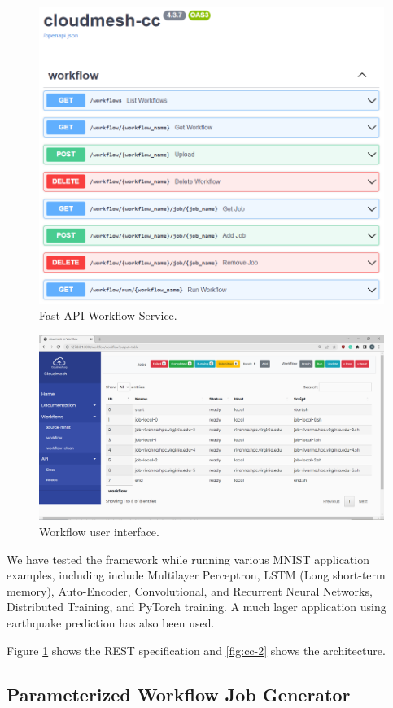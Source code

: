 \documentclass[utf8]{FrontiersinVancouver} %
\begin{document}
\begin{figure}[htb]
\centering\includegraphics[width=0.7\columnwidth]{images/fastapi-service.png}
\caption{Fast API Workflow Service.}
\label{fig:fastapi-cc}
\end{figure}



\begin{figure}[htb]
    \centering
    \includegraphics[width=0.70\columnwidth]{images/cc-1.png}
    \caption{Workflow user interface. }
    \label{fig:cc-3}
\end{figure}


We have tested the framework while running various MNIST application
examples, including include Multilayer Perceptron, LSTM (Long
short-term memory), Auto-Encoder, Convolutional, and Recurrent Neural
Networks, Distributed Training, and PyTorch training.  A much lager
application using earthquake prediction has also been used.

Figure \ref{fig:fastapi-cc} shows the REST specification and
\ref{fig:cc-2} shows the architecture.

\subsection{Parameterized Workflow Job Generator}
\label{sec:workflow-sbatch}
\end{document}
